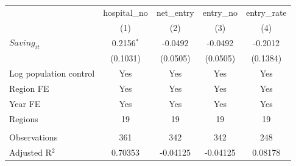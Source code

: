 \begingroup
\centering
\begin{tabular}{lcccc}
   \toprule
                          & hospital\_no  & net\_entry  & entry\_no  & entry\_rate \\    
                          & (1)           & (2)         & (3)        & (4)\\  
   \midrule 
   $Saving_{it}$          & 0.2156$^{*}$  & -0.0492     & -0.0492    & -0.2012\\   
                          & (0.1031)      & (0.0505)    & (0.0505)   & (0.1384)\\   
   Log population control & Yes           & Yes         & Yes        & Yes\\  
   Region FE              & Yes           & Yes         & Yes        & Yes\\  
   Year FE                & Yes           & Yes         & Yes        & Yes\\  
   Regions                & 19            & 19          & 19         & 19\\  
    \\
   Observations           & 361           & 342         & 342        & 248\\  
   Adjusted R$^2$         & 0.70353       & -0.04125    & -0.04125   & 0.08178\\  
   \bottomrule
\end{tabular}
\par\endgroup
